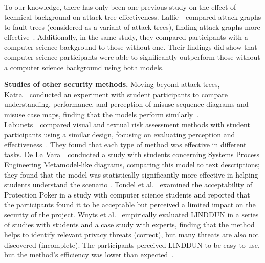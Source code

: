To our knowledge, there has only been one previous study on the effect of technical background on attack tree effectiveness. Lallie~\etal\ compared attack graphs to fault trees (considered as a variant of attack trees), finding attack graphs more effective~\cite{lallieEmpiricalEvaluationEffectiveness2017}. Additionally, in the same study, they compared participants with a computer science background to those without one. Their findings did show that computer science participants were able to significantly outperform those without a computer science background using both models. 

\textbf{Studies of other security methods.}
Moving beyond attack trees, Katta~\etal\ conducted an experiment with student participants to compare understanding, performance, and perception of misuse sequence diagrams and misuse case maps, finding that the models perform similarly~\cite{kattaComparingTwoTechniques2010}. 
Labunets~\etal\ compared visual and textual risk assessment methods with student participants using a similar design, focusing on evaluating perception and effectiveness~\cite{labunetsExperimentalComparisonTwo2013,labunets_no_2018}. They found that each type of method was effective in different tasks. De La Vara~\etal\ conducted a study with students concerning Systems Process Engineering Metamodel-like diagrams, comparing this model to text descriptions; they found that the model was statistically significantly more effective in helping students understand the scenario \cite{de_la_vara_empirical_2020}. Tondel et al.~\cite{tondel2019understanding} examined the acceptability of Protection Poker in a study with computer science students and reported that the participants found it to be acceptable but perceived a limited impact on the security of the project. Wuyts et al.~\cite{wuyts2014empirical} empirically evaluated LINDDUN in a series of studies with students and a case study with experts, finding that the method helps to identify relevant privacy threats (correct), but many threats are also not discovered (incomplete). The participants perceived LINDDUN to be easy to use, but the method's efficiency was lower than expected~\cite{wuyts2014empirical}.  

